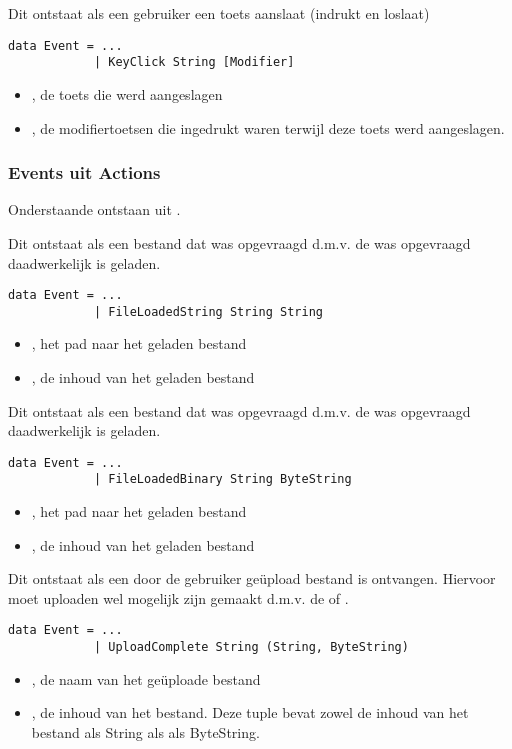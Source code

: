 Dit  ontstaat als een gebruiker een toets aanslaat (indrukt en loslaat)
\begin{lstlisting}
data Event = ...
			| KeyClick String [Modifier]
\end{lstlisting}
\begin{itemize}
	\item {}, de toets die werd aangeslagen
	\item \type{[Modifier]}, de modifiertoetsen die ingedrukt waren terwijl deze toets werd aangeslagen.
\end{itemize}

\subsubsection{Events uit Actions}
Onderstaande \events ontstaan uit \actions.

Dit  ontstaat als een bestand dat was opgevraagd d.m.v. de  was opgevraagd daadwerkelijk is geladen.
\begin{lstlisting}
data Event = ...
			| FileLoadedString String String
\end{lstlisting}
\begin{itemize}
	\item {}, het pad naar het geladen bestand
	\item {}, de inhoud van het geladen bestand
\end{itemize}

Dit  ontstaat als een bestand dat was opgevraagd d.m.v. de  was opgevraagd daadwerkelijk is geladen.
\begin{lstlisting}
data Event = ...
			| FileLoadedBinary String ByteString
\end{lstlisting}
\begin{itemize}
	\item {}, het pad naar het geladen bestand
	\item {}, de inhoud van het geladen bestand
\end{itemize}

Dit  ontstaat als een door de gebruiker geüpload bestand is ontvangen. Hiervoor moet uploaden wel mogelijk zijn gemaakt d.m.v. de  of .
\begin{lstlisting}
data Event = ...
			| UploadComplete String (String, ByteString)
\end{lstlisting}
\begin{itemize}
	\item {}, de naam van het ge\"uploade bestand
	\item {}, de inhoud van het bestand. Deze tuple bevat zowel de inhoud van het bestand als String als als ByteString.
\end{itemize}


